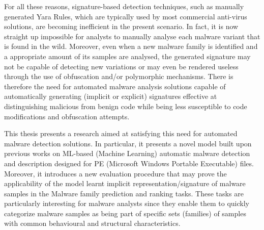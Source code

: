 \documentclass[pdfa%
,cucitura%
]{toptesi}
\begin{document}
For all these reasons, signature-based detection techniques, such as manually generated Yara Rules, which are typically used by most commercial anti-virus solutions, are becoming inefficient in the present scenario. In fact, it is now straight up impossible for analysts to manually analyse each malware variant that is found in the wild. Moreover, even when a new malware family is identified and a appropriate amount of its samples are analysed, the generated signature may not be capable of detecting new variations or may even be rendered useless through the use of obfuscation and/or polymorphic mechanisms. There is therefore the need for automated malware analysis solutions capable of automatically generating (implicit or explicit) signatures effective at distinguishing malicious from benign code while being less susceptible to code modifications and obfuscation attempts.

This thesis presents a research aimed at satisfying this need for automated malware detection solutions. In particular, it presents a novel model built upon previous works on ML-based (Machine Learning) automatic malware detection and description designed for PE (Microsoft Windows Portable Executable) files. Moreover, it introduces a new evaluation procedure that may prove the applicability of the model learnt implicit representation/signature of malware samples in the Malware family prediction and ranking tasks. These tasks are particularly interesting for malware analysts since they enable them to quickly categorize malware samples as being part of specific sets (families) of samples with common behavioural and structural characteristics.
\end{document}
